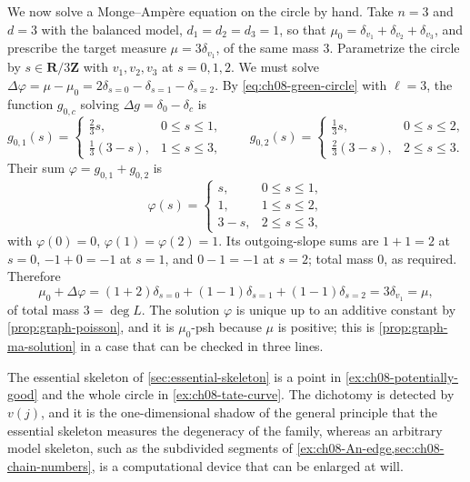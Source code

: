 \begin{example}
We now solve a Monge--Amp\`ere equation on the circle by hand.  Take
$n=3$ and $d=3$ with the balanced model, $d_1=d_2=d_3=1$, so that
$\mu_0=\delta_{v_1}+\delta_{v_2}+\delta_{v_3}$, and prescribe the target
measure $\mu=3\delta_{v_1}$, of the same mass $3$.  Parametrize the circle by
$s\in\mathbf R/3\mathbf Z$ with $v_1,v_2,v_3$ at $s=0,1,2$.  We must solve
$\Delta\varphi=\mu-\mu_0=2\delta_{s=0}-\delta_{s=1}-\delta_{s=2}$.  By
\eqref{eq:ch08-green-circle} with $\ell=3$, the function
$g_{0,c}$ solving $\Delta g=\delta_0-\delta_c$ is
\[
 g_{0,1}(s)=\begin{cases}\tfrac23s,&0\leq s\leq1,\\[1mm]
                          \tfrac13(3-s),&1\leq s\leq3,\end{cases}
 \qquad
 g_{0,2}(s)=\begin{cases}\tfrac13s,&0\leq s\leq2,\\[1mm]
                          \tfrac23(3-s),&2\leq s\leq3.\end{cases}
\]
Their sum $\varphi=g_{0,1}+g_{0,2}$ is
\[
 \varphi(s)=
 \begin{cases}
  s,&0\leq s\leq1,\\
  1,&1\leq s\leq2,\\
  3-s,&2\leq s\leq3 ,
 \end{cases}
\]
with $\varphi(0)=0$, $\varphi(1)=\varphi(2)=1$.  Its outgoing-slope sums are
$1+1=2$ at $s=0$, $-1+0=-1$ at $s=1$, and $0-1=-1$ at $s=2$; total mass $0$,
as required.  Therefore
\[
 \mu_0+\Delta\varphi
 =(1+2)\delta_{s=0}+(1-1)\delta_{s=1}+(1-1)\delta_{s=2}
 =3\delta_{v_1}=\mu ,
\]
of total mass $3=\deg L$.  The solution $\varphi$ is unique up to an additive
constant by \cref{prop:graph-poisson}, and it is $\mu_0$-psh because $\mu$ is
positive; this is \cref{prop:graph-ma-solution} in a case that can be
checked in three lines.
\end{example}

\begin{remark}
\label{rem:ch08-reduction-dichotomy}
The essential skeleton of \cref{sec:essential-skeleton} is a point in
\cref{ex:ch08-potentially-good} and the whole circle in
\cref{ex:ch08-tate-curve}.  The dichotomy is detected by $v(j)$, and it is
the one-dimensional shadow of the general principle that the essential
skeleton measures the degeneracy of the family, whereas an arbitrary model
skeleton, such as the subdivided segments of
\cref{ex:ch08-An-edge,sec:ch08-chain-numbers}, is a computational device that
can be enlarged at will.
\end{remark}

